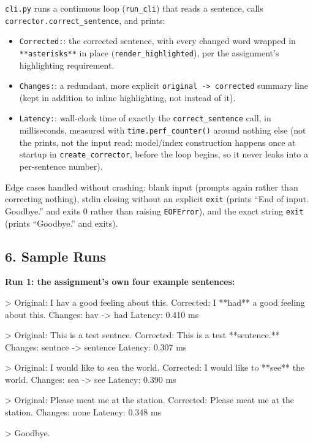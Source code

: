 \documentclass[11pt,a4paper]{article}
\begin{document}
\texttt{cli.\allowbreak{}py} runs a continuous loop (\texttt{run\_\allowbreak{}cli}) that reads a sentence, calls \texttt{corrector.\allowbreak{}correct\_\allowbreak{}sentence}, and prints:

\begin{itemize}
\item \texttt{Corrected:}: the corrected sentence, with every changed word wrapped in \texttt{**asterisks**} in place (\texttt{render\_\allowbreak{}highlighted}), per the assignment's highlighting requirement.
\item \texttt{Changes:}: a redundant, more explicit \texttt{original -\allowbreak{}> corrected} summary line (kept in addition to inline highlighting, not instead of it).
\item \texttt{Latency:}: wall-clock time of exactly the \texttt{correct\_\allowbreak{}sentence} call, in milliseconds, measured with \texttt{time.\allowbreak{}perf\_\allowbreak{}counter()} around nothing else (not the prints, not the input read; model/index construction happens once at startup in \texttt{create\_\allowbreak{}corrector}, before the loop begins, so it never leaks into a per-sentence number).
\end{itemize}

Edge cases handled without crashing: blank input (prompts again rather than correcting nothing), stdin closing without an explicit \texttt{exit} (prints ``End of input. Goodbye.'' and exits 0 rather than raising \texttt{EOFError}), and the exact string \texttt{exit} (prints ``Goodbye.'' and exits).

\subsection*{6. Sample Runs}

\textbf{Run 1: the assignment's own four example sentences:}

\begin{codeblock}
> Original:  I hav a good feeling about this.
Corrected: I **had** a good feeling about this.
Changes: hav -> had
Latency: 0.410 ms

> Original:  This is a test sentnce.
Corrected: This is a test **sentence.**
Changes: sentnce -> sentence
Latency: 0.307 ms

> Original:  I would like to sea the world.
Corrected: I would like to **see** the world.
Changes: sea -> see
Latency: 0.390 ms

> Original:  Please meat me at the station.
Corrected: Please meat me at the station.
Changes: none
Latency: 0.348 ms

> Goodbye.
\end{codeblock}
\end{document}
